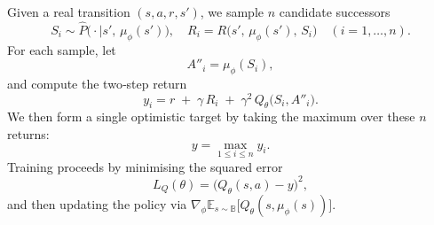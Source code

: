 \documentclass[11pt,a4paper]{report}
\begin{document}
Given a real transition \((s,a,r,s')\), we sample \(n\) candidate successors
\[
  S_i \sim \hat P\bigl(\cdot\mid s',\,\mu_\phi(s')\bigr),
  \quad
  R_i = R\bigl(s',\,\mu_\phi(s'),\,S_i\bigr)
  \quad (i=1,\dots,n).
\]
For each sample, let
\[
  A''_i = \mu_\phi(S_i),
\]
and compute the two‐step return
\[
  y_i = r 
       \;+\;\gamma\,R_i
       \;+\;\gamma^2\,Q_\theta\bigl(S_i, A''_i\bigr).
\]
We then form a single optimistic target by taking the maximum over these \(n\) returns:
\[
  y = \max_{1\le i \le n} y_i.
\]
Training proceeds by minimising the squared error
\[
  L_Q(\theta) = \bigl(Q_\theta(s,a) - y\bigr)^{2},
\]
and then updating the policy via
\(\displaystyle \nabla_\phi \mathbb E_{s\sim\mathbb B}\bigl[Q_\theta(s,\mu_\phi(s))\bigr]\).
%
%
%
%
\end{document}
